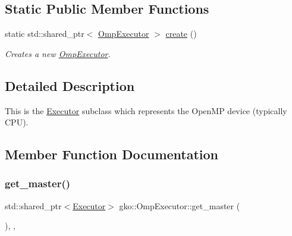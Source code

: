 \subsection*{Static Public Member Functions}
\begin{DoxyCompactItemize}
\item 
\mbox{\label{classgko_1_1OmpExecutor_a33ca05fdd0fc928ee262fc9425304874}} 
static std\+::shared\+\_\+ptr$<$ \hyperlink{classgko_1_1OmpExecutor}{Omp\+Executor} $>$ \hyperlink{classgko_1_1OmpExecutor_a33ca05fdd0fc928ee262fc9425304874}{create} ()
\begin{DoxyCompactList}\small\item\em Creates a new \hyperlink{classgko_1_1OmpExecutor}{Omp\+Executor}. \end{DoxyCompactList}\end{DoxyCompactItemize}


\subsection{Detailed Description}
This is the \hyperlink{classgko_1_1Executor}{Executor} subclass which represents the Open\+MP device (typically C\+PU). 

\subsection{Member Function Documentation}
\mbox{\label{classgko_1_1OmpExecutor_a5b83349e601d473cf8768c0bdbcaca8c}} 
\subsubsection{\texorpdfstring{get\+\_\+master()}{get\_master()}\hspace{0.1cm}{\footnotesize\ttfamily [1/2]}}
{\footnotesize\ttfamily std\+::shared\+\_\+ptr$<$\hyperlink{classgko_1_1Executor}{Executor}$>$ gko\+::\+Omp\+Executor\+::get\+\_\+master (\begin{DoxyParamCaption}{ }\end{DoxyParamCaption})\hspace{0.3cm}{\ttfamily [override]}, {\ttfamily [virtual]}, {\ttfamily [noexcept]}}



